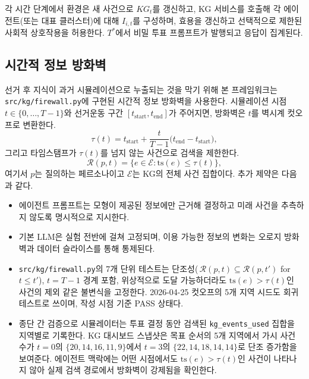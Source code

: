 \documentclass[11pt]{article}
\begin{document}
각 시간 단계에서 환경은 새 사건으로 $KG_t$를 갱신하고, KG 서비스를 호출해 각 에이전트(또는 대표 클러스터)에 대해 $I_{i,t}$를 구성하며, 효용을 갱신하고 선택적으로 제한된 사회적 상호작용을 허용한다. $T^*$에서 비밀 투표 프롬프트가 발행되고 응답이 집계된다.

\subsection{시간적 정보 방화벽}

선거 후 지식이 과거 시뮬레이션으로 누출되는 것을 막기 위해 본 프레임워크는 \texttt{src/kg/firewall.py}에 구현된 시간적 정보 방화벽을 사용한다. 시뮬레이션 시점 $t \in \{0, \dots, T-1\}$와 선거운동 구간 $[t_{\text{start}}, t_{\text{end}}]$가 주어지면, 방화벽은 $t$를 벽시계 컷오프로 변환한다.
\begin{equation}
\tau(t) = t_{\text{start}} + \frac{t}{T-1}\big(t_{\text{end}} - t_{\text{start}}\big),
\end{equation}
그리고 타임스탬프가 $\tau(t)$를 넘지 않는 사건으로 검색을 제한한다.
\begin{equation}
\mathcal{R}(p, t) = \big\{ e \in \mathcal{E} : \mathrm{ts}(e) \le \tau(t) \big\},
\end{equation}
여기서 $p$는 질의하는 페르소나이고 $\mathcal{E}$는 KG의 전체 사건 집합이다. 추가 제약은 다음과 같다.

\begin{itemize}
  \item 에이전트 프롬프트는 모형이 제공된 정보에만 근거해 결정하고 미래 사건을 추측하지 않도록 명시적으로 지시한다.
  \item 기본 LLM은 실험 전반에 걸쳐 고정되며, 이용 가능한 정보의 변화는 오로지 방화벽과 데이터 슬라이스를 통해 통제된다.
  \item \texttt{src/kg/firewall.py}의 7개 단위 테스트는 단조성(\,$\mathcal{R}(p,t) \subseteq \mathcal{R}(p,t')$ for $t \le t'$), $t=T-1$ 경계 포함, 위상적으로 도달 가능하더라도 $\mathrm{ts}(e) > \tau(t)$인 사건의 제외 같은 불변식을 고정한다. 2026-04-25 컷오프의 5개 지역 시드도 회귀 테스트로 쓰이며, 작성 시점 기준 PASS 상태다.
  \item 종단 간 검증으로 시뮬레이터는 투표 결정 동안 검색된 \texttt{kg\_events\_used} 집합을 지역별로 기록한다. KG 대시보드 스냅샷은 목표 순서의 5개 지역에서 가시 사건 수가 $t=0$의 $\{20, 14, 16, 11, 9\}$에서 $t=3$의 $\{22, 14, 18, 14, 14\}$로 단조 증가함을 보여준다. 에이전트 맥락에는 어떤 시점에서도 $\mathrm{ts}(e) > \tau(t)$인 사건이 나타나지 않아 실제 검색 경로에서 방화벽이 강제됨을 확인한다.
\end{itemize}
\end{document}
